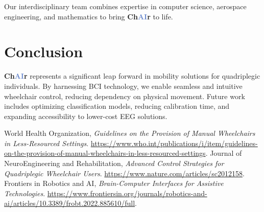 \documentclass[a4paper]{article}
\newcommand\chair{\textbf{Ch\textcolor[HTML]{6B8ACD}{AI}r}\xspace}
\begin{document}
Our interdisciplinary team combines expertise in computer science,
aerospace engineering, and mathematics to bring \chair to life.

\section{Conclusion}

\chair represents a significant leap forward in mobility solutions
for quadriplegic individuals. By harnessing BCI technology,
we enable seamless and intuitive wheelchair control, reducing dependency
on physical movement. Future work includes optimizing classification models,
reducing calibration time, and expanding accessibility to
lower-cost EEG solutions.

\begin{thebibliography}{9}
 World Health Organization, \textit{Guidelines on the Provision of Manual Wheelchairs in Less-Resourced Settings}. \url{https://www.who.int/publications/i/item/guidelines-on-the-provision-of-manual-wheelchairs-in-less-resourced-settings}.
 Journal of NeuroEngineering and Rehabilitation, \textit{Advanced Control Strategies for Quadriplegic Wheelchair Users}. \url{https://www.nature.com/articles/sc2012158}.
 Frontiers in Robotics and AI, \textit{Brain-Computer Interfaces for Assistive Technologies}. \url{https://www.frontiersin.org/journals/robotics-and-ai/articles/10.3389/frobt.2022.885610/full}.
\end{thebibliography}
\end{document}
